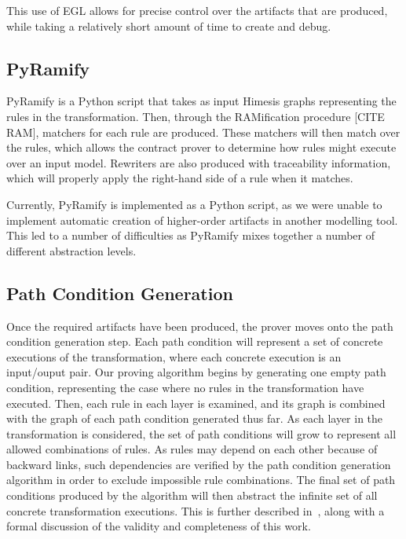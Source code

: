 This use of EGL allows for precise control over the artifacts that are produced, while taking a relatively short amount of time to create and debug.


\subsection{PyRamify}

PyRamify is a Python script that takes as input Himesis graphs representing the rules in the transformation. Then, through the RAMification procedure [CITE RAM], matchers for each rule are produced. These matchers will then match over the rules, which allows the contract prover to determine how rules might execute over an input model. Rewriters are also produced with traceability information, which will properly apply the right-hand side of a rule when it matches.

Currently, PyRamify is implemented as a Python script, as we were unable to implement automatic creation of higher-order artifacts in another modelling tool. This led to a number of difficulties as PyRamify mixes together a number of different abstraction levels.


\subsection{Path Condition Generation}

Once the required artifacts have been produced, the prover moves onto the path condition generation step.  Each
path condition will represent a set of concrete executions
of the transformation, where each concrete execution is an
input/ouput pair.
Our proving algorithm begins by generating one empty
path condition, representing the case where no rules in the
transformation have executed. Then, each rule in each layer
is examined, and its graph is combined with the graph of
each path condition generated thus far. As each layer in the
transformation is considered, the set of path conditions will
grow to represent all allowed combinations of rules. As rules
may depend on each other because of backward links, such
dependencies are verified by the path condition generation
algorithm in order to exclude impossible rule combinations.
The final set of path conditions produced by the algorithm
will then abstract the infinite set of all concrete transformation
executions. This is further described in~\cite{Lucio2014}, along with a
formal discussion of the validity and completeness of this
work.

